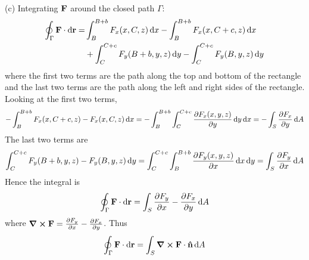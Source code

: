 \documentclass[../problems.tex]{subfiles}
\begin{document}
(c)
Integrating $\vb{F}$ around the closed path $\Gamma$:
\begin{align*}
    \oint_\Gamma \vb{F} \cdot \dd{\vb{r}} = &\int_B^{B+b} F_x(x, C, z) \dd{x}
        - \int_B^{B+b} F_x(x, C+c, z) \dd{x} \\
        &+ \int_C^{C+c} F_y(B+b, y, z) \dd{y} - \int_C^{C+c} F_y(B, y, z) \dd{y}
\end{align*}
where the first two terms are the path along the top and bottom of the rectangle and the last two
terms are the path along the left and right sides of the rectangle. Looking at the first two terms,
\begin{align*}
    -\int_B^{B+b} F_x(x, C+c, z) - F_x(x, C, z) \dd{x} 
    = -\int_B^{B+b} \int_C^{C+c} \pdv{F_x(x,y,z)}{y} \dd{y} \dd{x}
    = -\int_S \pdv{F_x}{y} \dd{A}
\end{align*}
The last two terms are
\begin{align*}
    \int_C^{C+c} F_y(B+b, y, z) - F_y(B, y, z) \dd{y} 
    = \int_C^{C+c} \int_B^{B+b} \pdv{F_y(x,y,z)}{x} \dd{x} \dd{y}
    = \int_S \pdv{F_y}{x} \dd{A}
\end{align*}
Hence the integral is
\begin{align*}
    \oint_\Gamma \vb{F} \cdot \dd{\vb{r}} = \int_S \pdv{F_y}{x} - \pdv{F_x}{y} \dd{A}
\end{align*}
where $\curl{\vb{F}} = \pdv{F_y}{x} - \pdv{F_x}{y}$. Thus
\begin{align*}
    \oint_\Gamma \vb{F} \cdot \dd{\vb{r}} = \int_S \curl{\vb{F}} \cdot \vu{n} \dd{A}
\end{align*}
\end{document}
